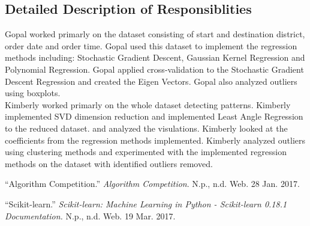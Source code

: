\documentclass[paper=a4, fontsize=11pt]{scrartcl} %
\numberwithin{equation}{section} %
\numberwithin{table}{section} %
\begin{document}
\subsection{Detailed Description of Responsiblities}
Gopal worked primarly on the dataset consisting of start and destination district, order date and order time. Gopal used this dataset to implement the regression methods including: Stochastic Gradient Descent, Gaussian Kernel Regression and Polynomial Regression. Gopal applied cross-validation to the Stochastic Gradient Descent Regression and created the Eigen Vectors.  Gopal also analyzed outliers using boxplots.\\

Kimberly worked primarly on the whole dataset detecting patterns. Kimberly implemented SVD dimension reduction and implemented Least Angle Regression to the reduced dataset. and analyzed the visulations. Kimberly looked at the coefficients from the regression methods implemented.  Kimberly analyzed outliers using clustering methods and experimented with the implemented regression methods on the dataset with identified outliers removed.  


\begin{thebibliography}{1}

\enquote{Algorithm Competition.} \textit{Algorithm Competition}. N.p., n.d. Web. 28 Jan. 2017.

\enquote{Scikit-learn.} \textit{Scikit-learn: Machine Learning in Python - Scikit-learn 0.18.1 Documentation.} N.p., n.d. Web. 19 Mar. 2017.

\end{thebibliography}
\end{document}

